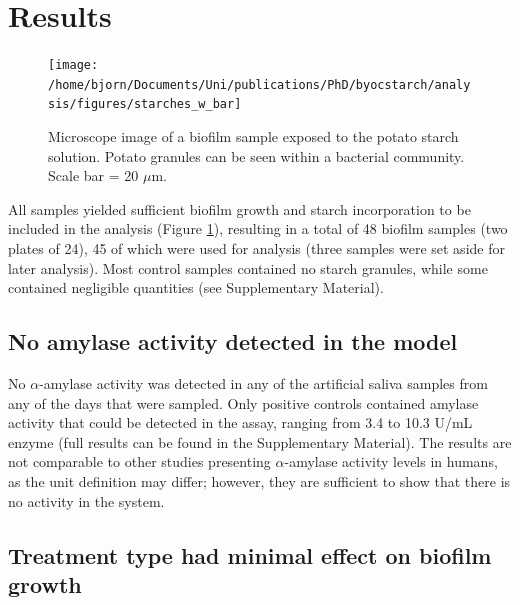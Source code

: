 \documentclass[
]{article}
\begin{document}
\hypertarget{results}{%
\section{Results}\label{results}}

\begin{figure}

{\centering \texttt{[image: /home/bjorn/Documents/Uni/publications/PhD/byocstarch/analysis/figures/starches\_w\_bar]} 

}

\caption{Microscope image of a biofilm sample exposed to the potato starch solution. Potato granules can be seen within a bacterial community. Scale bar = 20 $\mu$m.}\label{fig:microscope-fig}
\end{figure}

All samples yielded sufficient biofilm growth and starch incorporation to be
included in the analysis (Figure \ref{fig:microscope-fig}), resulting in a total of 48 biofilm samples (two plates of 24),
45 of which were used for analysis (three samples were set aside for later
analysis).
Most control samples contained no starch granules, while some contained negligible
quantities (see Supplementary Material).

\hypertarget{no-amylase-activity-detected-in-the-model}{%
\subsection{No amylase activity detected in the model}\label{no-amylase-activity-detected-in-the-model}}

No \(\alpha\)-amylase activity was detected in any of the artificial
saliva samples from any of the days that were sampled. Only positive controls
contained amylase activity that could be detected in the assay, ranging from
3.4 to 10.3 U/mL enzyme
(full results can be found in the Supplementary Material).
The results are not comparable to other studies presenting \(\alpha\)-amylase activity
levels in humans, as the unit definition may differ;
however, they are sufficient to show that there is no activity in the system.

\hypertarget{treatment-type-had-minimal-effect-on-biofilm-growth}{%
\subsection{Treatment type had minimal effect on biofilm growth}\label{treatment-type-had-minimal-effect-on-biofilm-growth}}
\end{document}

